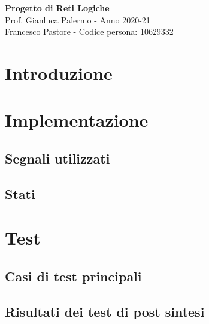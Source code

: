 \documentclass{article}
\begin{document}
\begin{titlepage}
    \centering
    \vspace*{\fill}
    \Huge\textbf{Progetto di Reti Logiche}\\
    \vspace{5mm} %
    \Large Prof. Gianluca Palermo - Anno 2020-21\\
    \vspace{5mm} %
    \large Francesco Pastore - Codice persona: 10629332\\
    \vspace*{\fill}
\end{titlepage}

\tableofcontents
\pagebreak

\section{Introduzione}

\section{Implementazione}

\subsection{Segnali utilizzati}
\subsection{Stati}

\section{Test}
\subsection{Casi di test principali}
\subsection{Risultati dei test di post sintesi}
\end{document}
